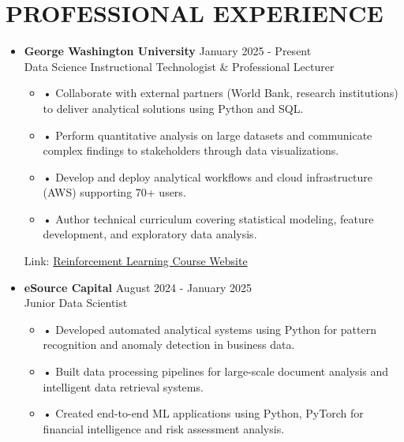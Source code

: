 \documentclass[a4paper,9pt]{extarticle}
\begin{document}

\section*{PROFESSIONAL EXPERIENCE}

\begin{itemize}[leftmargin=0.4cm, label={}]
    \item \textbf{George Washington University} \hfill January 2025 - Present \\
    Data Science Instructional Technologist \& Professional Lecturer
    \vspace{-0.1cm}
    \begin{itemize}[leftmargin=0.3cm, label={}]
    \item \small{•} \normalsize{Collaborate with external partners (World Bank, research institutions) to deliver analytical solutions using Python and SQL.}
    \item \small{•} \normalsize{Perform quantitative analysis on large datasets and communicate complex findings to stakeholders through data visualizations.}
    \item \small{•} \normalsize{Develop and deploy analytical workflows and cloud infrastructure (AWS) supporting 70+ users.}
    \item \small{•} \normalsize{Author technical curriculum covering statistical modeling, feature development, and exploratory data analysis.}
    \end{itemize}
    Link: \href{https://twallett.com/courses/reinforcement-learning/}{Reinforcement Learning Course Website}
\end{itemize}

\noindent
\begin{itemize}[leftmargin=0.4cm, label={}]
    \item \textbf{eSource Capital} \hfill August 2024 - January 2025 \\
    Junior Data Scientist 
    \vspace{-0.1cm}
    \begin{itemize}[leftmargin=0.3cm, label={}]
    \item \small{•} \normalsize{Developed automated analytical systems using Python for pattern recognition and anomaly detection in business data.}
    \item \small{•} \normalsize{Built data processing pipelines for large-scale document analysis and intelligent data retrieval systems.}
    \item \small{•} \normalsize{Created end-to-end ML applications using Python, PyTorch for financial intelligence and risk assessment analysis.}
\end{itemize}
\end{itemize}
\end{document}
